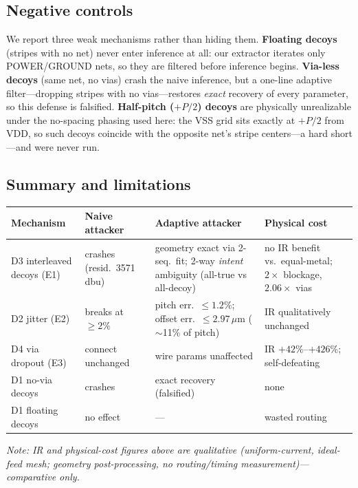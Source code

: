 \documentclass[11pt]{article}
\begin{document}
\subsection{Negative controls}
\label{sec:neg}

We report three weak mechanisms rather than hiding them.
\textbf{Floating decoys} (stripes with no net) never enter inference at
all: our extractor iterates only POWER/GROUND nets, so they are filtered
before inference begins.  \textbf{Via-less decoys} (same net, no vias)
crash the naive inference, but a one-line adaptive filter---dropping
stripes with no vias---restores \emph{exact} recovery of every
parameter, so this defense is falsified.  \textbf{Half-pitch ($+P/2$)
decoys} are physically unrealizable under the no-spacing phasing used
here: the VSS grid sits exactly at
$+P/2$ from VDD, so such decoys coincide with the opposite net's stripe
centers---a hard short---and were never run.

\subsection{Summary and limitations}
\label{sec:deflim}

\begin{center}
\small
\begin{tabular}{l>{\raggedright\arraybackslash}p{2.4cm}>{\raggedright\arraybackslash}p{4.1cm}>{\raggedright\arraybackslash}p{4.1cm}}
\toprule
Mechanism & Naive attacker & Adaptive attacker & Physical cost \\
\midrule
D3 interleaved decoys (E1) & crashes (resid.\ 3571\,dbu) & geometry exact via 2-seq.\ fit; 2-way \emph{intent} ambiguity (all-true vs all-decoy) & no IR benefit vs.\ equal-metal; $2\times$ blockage, $2.06\times$ vias \\
D2 jitter (E2) & breaks at $\geq 2\%$ & pitch err.\ $\leq 1.2\%$; offset err.\ $\leq 2.97\,\mu$m ($\sim$11\% of pitch) & IR qualitatively unchanged \\
D4 via dropout (E3) & connect unchanged & wire params unaffected & IR $+42\%$--$+426\%$; self-defeating \\
D1 no-via decoys & crashes & exact recovery (falsified) & none \\
D1 floating decoys & no effect & --- & wasted routing \\
\bottomrule
\end{tabular}
\end{center}
\textit{Note: IR and physical-cost figures above are qualitative
(uniform-current, ideal-feed mesh; geometry post-processing, no
routing/timing measurement)---comparative only.}
\end{document}
